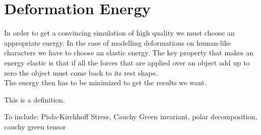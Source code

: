 \section{Deformation Energy}

In order to get a convincing simulation of high quality we must choose an appropriate energy. In the case of modelling deformations on human-like characters we have to choose an elastic energy. The key property that makes an energy elastic is that if all the forces that are applied over an object add up to zero the object must come back to its rest shape.
\\
The energy then has to be minimized to get the results we want.

\begin{definition}
  This is a definition.
\end{definition}



To include: Piola-Kirchhoff Stress, Cauchy Green invariant, polar decomposition, cauchy green tensor




